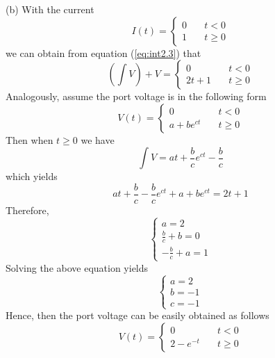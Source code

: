 (b) With the current
\begin{equation}
    I(t) = 
    \begin{cases}
    0 \quad  &t<0    \\
    1 \quad  &t\geq0   
    \end{cases}
\end{equation}
we can obtain from equation (\ref{eq:int2.3}) that 
\begin{equation}
    (\int V) + V = 
    \begin{cases}
    0 \quad  &t<0    \\
    2t+1 \quad  &t\geq0   
    \end{cases}
\end{equation}
Analogously, assume the port voltage is in the following form
\begin{equation}
    V(t) = 
    \begin{cases}
    0 \quad  &t<0    \\
    a+be^{ct} \quad  &t\geq0   
    \end{cases}
\end{equation}
Then when $t\geq0$ we have 
\begin{equation}
    \int V = at + \frac{b}{c}e^{ct} - \frac{b}{c}
\end{equation}
which yields
\begin{equation}
    at + \frac{b}{c} - \frac{b}{c}e^{ct} + a+be^{ct} = 2t + 1
\end{equation}
Therefore,
\begin{equation}
    \begin{cases}
        a = 2   \\
        \frac{b}{c} + b = 0     \\
        -\frac{b}{c} + a = 1
    \end{cases}
\end{equation}
Solving the above equation yields
\begin{equation}
    \begin{cases}
        a = 2   \\
        b = -1     \\
        c = -1
    \end{cases}
\end{equation}
Hence, then the port voltage can be easily obtained as follows
\begin{equation}
    V(t) = 
    \begin{cases}
    0 \quad  &t<0    \\
    2-e^{-t} \quad  &t\geq0   
    \end{cases}
\end{equation}


